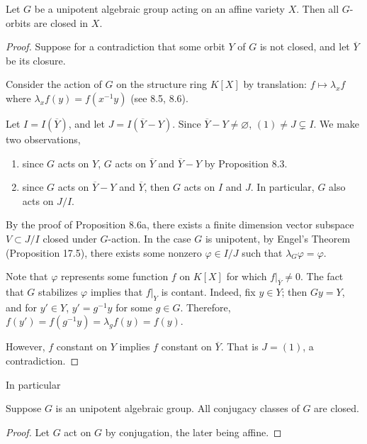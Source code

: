 \begin{prop}[Ex. 17.8]\label{ex_17_8}
Let $G$ be a unipotent algebraic group acting on an affine variety 
$X$. Then all $G$-orbits are closed in $X$.
\end{prop}

\begin{proof}
Suppose for a contradiction that some orbit $Y$ of $G$ is not
closed, and let $\overline{Y}$ be its closure.

Consider the action of $G$ on the structure ring $K[X]$ by 
translation: $f \mapsto \lambda_x f$ where $\lambda_x f(y) = 
f(x^{-1}y)$ (see 8.5, 8.6). 

Let $I = I(\overline{Y})$, and let $J = I(\overline{Y} - Y)$.
Since $\overline{Y} - Y \neq \varnothing$, $(1) \neq J \subsetneq 
I$. We make two observations,

\begin{enumerate}
\item since $G$ acts on $Y$, $G$ acts on $\overline{Y}$ and 
$\overline{Y} - Y$ by Proposition 8.3.

\item since $G$ acts on $\overline{Y} - Y$ and $\overline{Y}$, 
then $G$ acts on $I$ and $J$. In particular, $G$ also acts on
$J/I$.
\end{enumerate}

By the proof of Proposition 8.6a, there exists a finite dimension 
vector subspace $V \subset J/I$ closed under $G$-action. In the 
case $G$ is unipotent, by Engel's Theorem (Proposition 17.5), 
there exists some nonzero $\varphi \in I/J$ such that $\lambda_G 
\varphi = \varphi$.

Note that $\varphi$ represents some function $f$ on $K[X]$ for
which $f|_{\overline{Y}} \neq 0$. The fact that $G$ stabilizes 
$\varphi$ implies that $f|_Y$ is contant. Indeed, fix $y \in Y$;
then $Gy = Y$, and for $y' \in Y$, $y' = g^{-1}y$ for some $g \in G$.
Therefore, $f(y') = f(g^{-1}y) = \lambda_{g}f(y) = f(y)$.

However, $f$ constant on $Y$ implies $f$ constant on $\overline{Y}$.
That is $J = (1)$, a contradiction.
\end{proof}

In particular

\begin{cor}
Suppose $G$ is an unipotent algebraic group. All conjugacy 
classes of $G$ are closed.
\end{cor}
\begin{proof}
Let $G$ act on $G$ by conjugation, the later being affine.
\end{proof}

